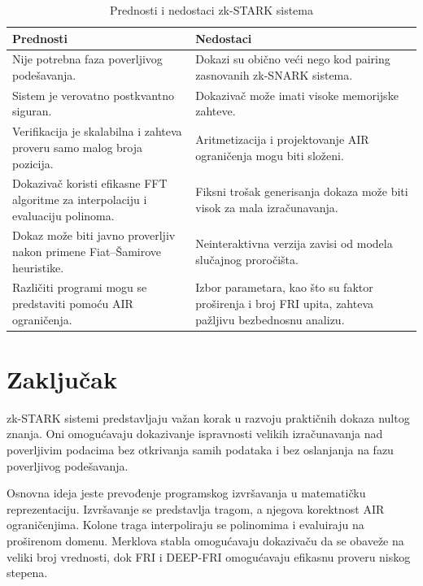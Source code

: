 \begin{table}[ht]
\centering
\small

\begin{tabular}{
    |p{}
    |p{}|
}
\hline

\textbf{Prednosti}
&
\textbf{Nedostaci}
\\
\hline

Nije potrebna faza poverljivog podešavanja.
&
Dokazi su obično veći nego kod pairing zasnovanih zk-SNARK sistema.
\\
\hline

Sistem je verovatno postkvantno siguran.
&
Dokazivač može imati visoke memorijske zahteve.
\\
\hline

Verifikacija je skalabilna i zahteva proveru samo malog broja pozicija.
&
Aritmetizacija i projektovanje AIR ograničenja mogu biti složeni.
\\
\hline

Dokazivač koristi efikasne FFT algoritme za interpolaciju i evaluaciju polinoma.
&
Fiksni trošak generisanja dokaza može biti visok za mala izračunavanja.
\\
\hline

Dokaz može biti javno proverljiv nakon primene Fiat--Šamirove heuristike.
&
Neinteraktivna verzija zavisi od modela slučajnog proročišta.
\\
\hline

Različiti programi mogu se predstaviti pomoću AIR ograničenja.
&
Izbor parametara, kao što su faktor proširenja i broj FRI upita, zahteva pažljivu bezbednosnu analizu.
\\
\hline

\end{tabular}

\caption{Prednosti i nedostaci zk-STARK sistema}
\label{tab:stark-prednosti-nedostaci}
\end{table}

\section{Zaključak}

zk-STARK sistemi predstavljaju važan korak u razvoju praktičnih dokaza nultog
znanja. Oni omogućavaju dokazivanje ispravnosti velikih izračunavanja nad
poverljivim podacima bez otkrivanja samih podataka i bez oslanjanja na fazu
poverljivog podešavanja.

Osnovna ideja jeste prevođenje programskog izvršavanja u matematičku
reprezentaciju. Izvršavanje se predstavlja tragom, a njegova korektnost AIR
ograničenjima. Kolone traga interpoliraju se polinomima i evaluiraju na
proširenom domenu. Merklova stabla omogućavaju dokazivaču da se obaveže na
veliki broj vrednosti, dok FRI i DEEP-FRI omogućavaju efikasnu proveru niskog
stepena.

